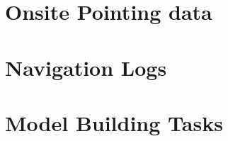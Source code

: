 \documentclass[
  12pt,
]{book}
\begin{document}
\hypertarget{onsite-pointing-data}{%
\section{Onsite Pointing data}\label{onsite-pointing-data}}

\hypertarget{navigation-logs}{%
\section{Navigation Logs}\label{navigation-logs}}

\hypertarget{model-building-tasks}{%
\section{Model Building Tasks}\label{model-building-tasks}}

  
\end{document}
